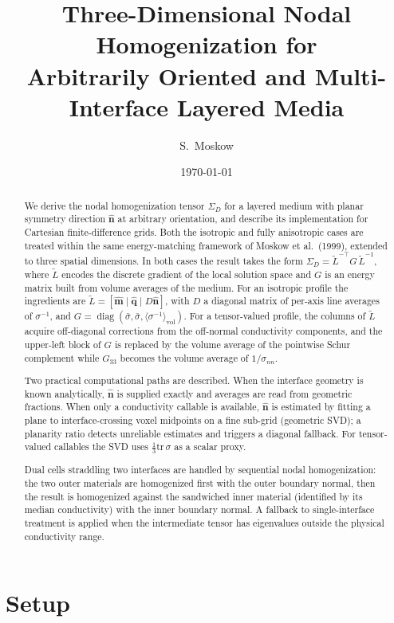 \documentclass[11pt]{article}
\title{Three-Dimensional Nodal Homogenization for\\
       Arbitrarily Oriented and Multi-Interface Layered Media}
\author{S.\ Moskow}
\date{\today}
\newcommand{\nn}{\hat{\bm{n}}}
\newcommand{\mm}{\hat{\bm{m}}}
\newcommand{\qq}{\hat{\bm{q}}}
\newcommand{\tL}{\widetilde{L}}
\newcommand{\SD}{\Sigma_D}
\newcommand{\sbar}{\bar{\sigma}}
\newcommand{\invs}{\langle\sigma^{-1}\rangle_{\mathrm{vol}}}
\begin{document}
\maketitle

\begin{abstract}
We derive the nodal homogenization tensor $\SD$ for a layered medium
with planar symmetry direction $\nn$ at arbitrary orientation, and describe
its implementation for Cartesian finite-difference grids.
Both the isotropic and fully anisotropic cases are treated within the same
energy-matching framework of Moskow et al.\ (1999), extended to three spatial
dimensions.  In both cases the result takes the form
$\SD = \tL^{-\top} G\,\tL^{-1}$,
where $\tL$ encodes the discrete gradient of the local solution space and $G$
is an energy matrix built from volume averages of the medium.
For an isotropic profile the ingredients are
$\tL = [\mm\mid\qq\mid D\nn]$, with $D$ a diagonal matrix of per-axis line
averages of $\sigma^{-1}$, and $G = \operatorname{diag}(\sbar,\sbar,\invs)$.
For a tensor-valued profile, the columns of $\tL$ acquire off-diagonal
corrections from the off-normal conductivity components, and the upper-left
block of $G$ is replaced by the volume average of the pointwise Schur
complement while $G_{33}$ becomes the volume average of $1/\sigma_{nn}$.

Two practical computational paths are described.  When the interface geometry
is known analytically, $\nn$ is supplied exactly and averages are read from
geometric fractions.  When only a conductivity callable is available, $\nn$
is estimated by fitting a plane to interface-crossing voxel midpoints on a
fine sub-grid (geometric SVD); a planarity ratio detects unreliable estimates
and triggers a diagonal fallback.  For tensor-valued callables the SVD uses
$\tfrac{1}{3}\mathrm{tr}\,\sigma$ as a scalar proxy.

Dual cells straddling two interfaces are handled by sequential nodal homogenization: the two outer materials are homogenized first with the
outer boundary normal, then the result is homogenized against the sandwiched
inner material (identified by its median conductivity) with the inner boundary
normal.  A fallback to single-interface treatment is applied when the
intermediate tensor has eigenvalues outside the physical conductivity range.
\end{abstract}

\section{Setup}
\end{document}
